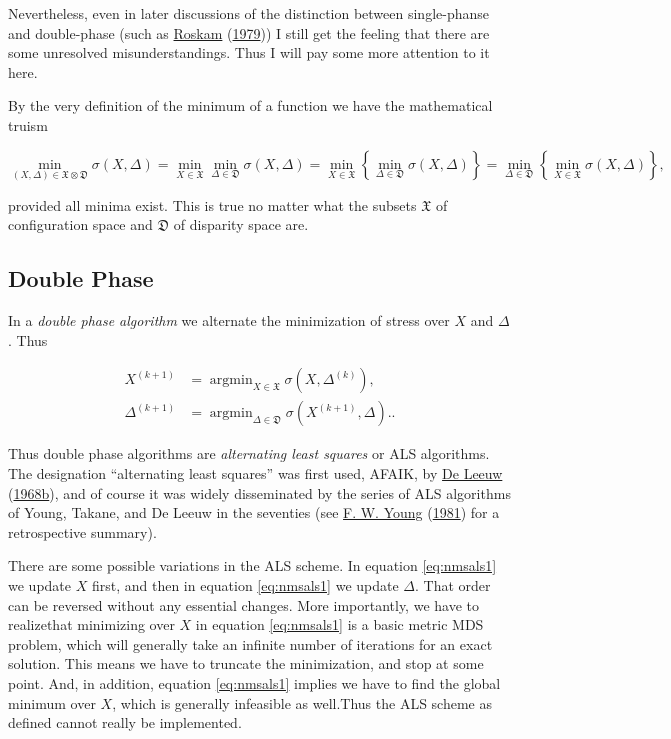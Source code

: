 \documentclass[
  12pt,
]{book}
\theoremstyle{definition}
\theoremstyle{definition}
\theoremstyle{definition}
\theoremstyle{definition}
\theoremstyle{remark}
\begin{document}
Nevertheless, even in later discussions of the distinction between single-phanse and double-phase (such as \protect\hyperlink{ref-roskam_79}{Roskam} (\protect\hyperlink{ref-roskam_79}{1979})) I still get the feeling that there are some unresolved misunderstandings. Thus I will pay some more attention to it here.

By the very definition of the minimum of a function we have the mathematical truism

\begin{equation}
\min_{(X,\Delta)\in\mathfrak{X}\otimes\mathfrak{D}}\sigma(X,\Delta)=
\min_{X\in\mathfrak{X}}\min_{\Delta\in\mathfrak{D}}\sigma(X,\Delta)=\min_{X\in\mathfrak{X}}\left\{\min_{\Delta\in\mathfrak{D}}\sigma(X,\Delta)\right\}=\min_{\Delta\in\mathfrak{D}}\left\{\min_{X\in\mathfrak{X}}\sigma(X,\Delta)\right\},
\label{eq:nmsminmin}
\end{equation}

provided all minima exist. This is true no matter what the subsets \(\mathfrak{X}\) of configuration space and \(\mathfrak{D}\) of disparity space are.

\hypertarget{double-phase}{%
\subsection{Double Phase}\label{double-phase}}

In a \emph{double phase algorithm} we alternate the minimization of stress over \(X\) and \(\Delta\). Thus

\begin{align}
X^{(k+1)}&=\mathop{\text{argmin}}_{X\in\mathfrak{X}}\sigma(X,\Delta^{(k)}),\label{eq:nmsals1}\\
\Delta^{(k+1)}&=\mathop{\text{argmin}}_{\Delta\in\mathfrak{D}}\sigma(X^{(k+1)},\Delta).\label{eq:nmsals2}.
\end{align}

Thus double phase algorithms are \emph{alternating least squares} or ALS algorithms.
The designation ``alternating least squares'' was first used, AFAIK, by \protect\hyperlink{ref-deleeuw_R_68d}{De Leeuw} (\protect\hyperlink{ref-deleeuw_R_68d}{1968b}), and of course it was widely disseminated by the series of ALS algorithms of Young, Takane, and De Leeuw in the seventies (see \protect\hyperlink{ref-young_81}{F. W. Young} (\protect\hyperlink{ref-young_81}{1981}) for a retrospective summary).

There are some possible variations in the ALS scheme. In equation \eqref{eq:nmsals1}
we update \(X\) first, and then in equation \eqref{eq:nmsals1} we update \(\Delta\). That order can be reversed without any essential changes. More importantly, we have to realizethat minimizing over \(X\) in equation \eqref{eq:nmsals1} is a basic metric MDS problem, which will generally take an infinite number of iterations for an exact solution. This means we have to truncate the minimization, and stop at some point. And, in addition, equation \eqref{eq:nmsals1} implies we have to find the global minimum over \(X\), which is generally infeasible as well.Thus the ALS scheme as defined cannot really be implemented.
\end{document}
